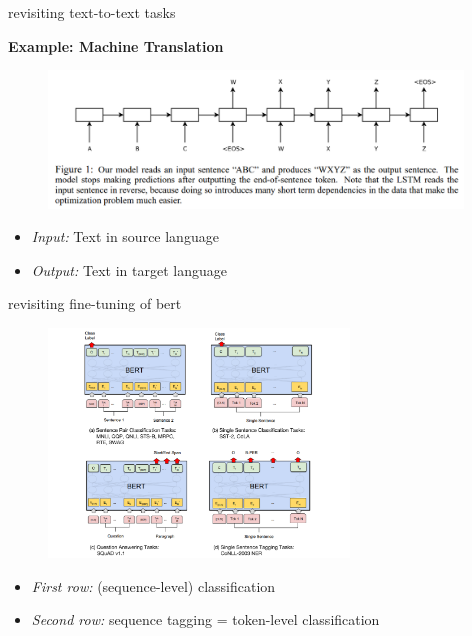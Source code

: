 
\begin{frame}{revisiting text-to-text tasks}

\vfill

\textbf{Example: Machine Translation}
	
	\begin{figure}
		\centering
		\includegraphics[width = 11cm]{../chapter01-basics/figure/seq2seq.png}\\ 
	\end{figure}

\begin{itemize}
	\item \textit{Input:} Text in source language
	\item \textit{Output:} Text in target language
\end{itemize}

\vfill

\end{frame}


\begin{frame}{revisiting fine-tuning of bert}

\vfill

	\begin{figure}
	\centering
		\includegraphics[width = 8cm]{../chapter04-bert/figure/bert-finetune.png}\\ 
	\end{figure}
	
\begin{itemize}
	\item \textit{First row:} (sequence-level) classification
	\item \textit{Second row:} sequence tagging = token-level classification
\end{itemize}

\vfill

\end{frame}

